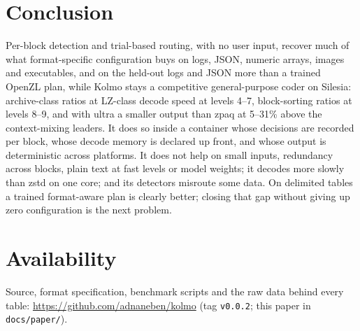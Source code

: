 \documentclass[conference]{IEEEtran}
\begin{document}
\section{Conclusion}

Per-block detection and trial-based routing, with no user input, recover much of what format-specific
configuration buys on logs, JSON, numeric arrays, images and executables, and on the held-out logs and JSON more than
a trained OpenZL plan, while Kolmo stays a competitive general-purpose coder on Silesia: archive-class ratios at LZ-class decode speed at levels 4--7,
block-sorting ratios at levels 8--9, and with ultra a smaller output than zpaq at 5--31\% above the context-mixing
leaders. It does so inside a container
whose decisions are recorded per block, whose decode memory is declared up front, and whose output is deterministic
across platforms. It does not help on small inputs, redundancy across blocks, plain text at fast levels or model
weights; it decodes more slowly than zstd on one core; and its detectors misroute some data. On delimited tables a trained format-aware plan is clearly better; closing that gap
without giving up zero configuration is the next problem.

\section*{Availability}
Source, format specification, benchmark scripts and the raw data behind every table:
\url{https://github.com/adnaneben/kolmo} (tag \texttt{v0.0.2}; this paper in \texttt{docs/paper/}).



\end{document}
